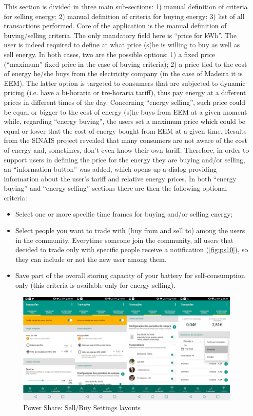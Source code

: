 This section is divided in three main sub-sections: 1) manual definition of criteria for selling energy; 2) manual definition of criteria for buying energy; 3) list of all transactions performed.
Core of the application is the manual definition of buying/selling criteria. The only mandatory field here is “price for kWh”. The user is indeed required to define at what price (s)he is willing to buy as well as sell energy. In both cases, two are the possible options: 1) a fixed price (“maximum” fixed price in the case of buying criteria); 2) a price tied to the cost of energy he/she buys from the electricity company (in the case of Madeira it is \ac{EEM}). The latter option is targeted to consumers that are subjected to dynamic pricing (i.e. have a bi-horaria or tre-horaria tariff), thus pay energy at a different prices in different times of the day. Concerning “energy selling”, such price could be equal or bigger to the cost of energy (s)he buys from \ac{EEM} at a given moment while, regarding “energy buying”, the users set a maximum price which could be equal or lower that the cost of energy bought from \ac{EEM} at a given time. Results from the \ac{SINAIS} project revealed that many consumers are not aware of the cost of energy and, sometimes, don’t even know their own tariff. Therefore, in order to support users in defining the price for the energy they are buying and/or selling, an “information button” was added, which opens up a dialog providing information about the user’s tariff and relative energy prices. 
In both “energy buying” and “energy selling” sections there are then the following optional criteria:
\begin{itemize}
    \item Select one or more specific time frames for buying and/or selling energy;
    \item Select people you want to trade with (buy from and sell to) among the users in the community. Everytime someone join the community, all users that decided to trade only with specific people receive a notification (\cref{fig:ps10}), so they can include or not the new user among them. 
    \item Save part of the overall storing capacity of your battery for self-consumption only (this criteria is available only for energy selling). 
\end{itemize}


\begin{figure}[h]
\centering
\includegraphics[width=1\textwidth]{./Images/ps9}
\caption{Power Share: Sell/Buy Settings layouts}
\label{fig:ps9}
\end{figure}

